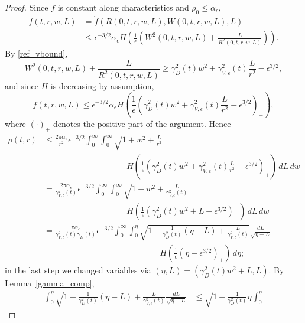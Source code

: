 \documentclass[10pt,a4paper]{amsart}
\begin{document}
\begin{proof}
  Since $f$ is constant along characteristics and
  $\rho_0\leq \alpha_\epsilon$,
  \begin{align*}
    f(t,r,w,L)
    &= \mathring f (R(0,t,r,w,L),W(0,t,r,w,L),L)\\
    &\leq
    \epsilon^{-3/2} \alpha_\epsilon
    H\left(\frac{1}{\epsilon}\left(W^2(0,t,r,w,L)+\frac{L}{R^2(0,t,r,w,L)}
    \right)\right).
  \end{align*}
  By \eqref{ref_vbound},
  \[
  W^2(0,t,r,w,L)+\frac{L}{R^2(0,t,r,w,L)} \geq
  \gamma_D^2(t) w^2 + \gamma^2_{V,\epsilon}(t) \frac{L}{r^2}-\epsilon^{3/2},
  \]
  and since $H$ is decreasing by assumption,
  \[
  f(t,r,w,L)  \leq 
  \epsilon^{-3/2} \alpha_\epsilon
  H\left(\frac{1}{\epsilon}
  \left(\gamma_D^2(t) w^2 + \gamma^2_{V,\epsilon}(t) \frac{L}{r^2}
  -\epsilon^{3/2}\right)_+\right),
  \]
  where $(\cdot)_+$ denotes the positive part of the argument. Hence
  \begin{align*}
    \rho(t,r)
    &
    \leq 
    \frac{2 \pi \alpha_\epsilon}{r^2}\epsilon^{-3/2}
    \int_0^\infty\int_0^\infty \sqrt{1+w^2 +\frac{L}{r^2}}\\
    &
    \qquad\qquad\qquad\qquad\qquad
    H\left(\frac{1}{\epsilon}
    \left(\gamma_D^2(t) w^2 + \gamma^2_{V,\epsilon}(t) \frac{L}{r^2}
    -\epsilon^{3/2}\right)_+\right)
    \,dL\,dw\\
    &
    = 
    \frac{2 \pi \alpha_\epsilon}{\gamma^2_{V,\epsilon}(t)}\epsilon^{-3/2}
    \int_0^\infty\int_0^\infty \sqrt{1+w^2 +\frac{L}{\gamma^2_{V,\epsilon}(t)}}\\
    &
    \qquad\qquad\qquad\qquad\qquad
    H\left(\frac{1}{\epsilon}
    \left(\gamma_D^2(t) w^2 +  L -\epsilon^{3/2}\right)_+\right)
    \,dL\,dw\\
    &
    = 
    \frac{\pi \alpha_\epsilon}{\gamma^2_{V,\epsilon}(t) \gamma_D(t)}\epsilon^{-3/2}
    \int_0^\infty\int_0^\eta
    \sqrt{1+\frac{1}{\gamma_D^2(t)} (\eta - L) +\frac{L}{\gamma^2_{V,\epsilon}(t)}}
    \frac{dL}{\sqrt{\eta-L}}\\
    &
    \qquad\qquad\qquad\qquad\qquad\qquad\qquad
    H\left(\frac{1}{\epsilon}
    \left(\eta -\epsilon^{3/2}\right)_+ \right)\, d\eta;
  \end{align*}
  in the last step we changed variables via
  $(\eta,L)=(\gamma_D^2(t) w^2 +  L,L)$.
  By Lemma~\ref{gamma_comp},
  \begin{align*}
    \int_0^\eta
    \sqrt{1+\frac{1}{\gamma_D^2(t)} (\eta - L) +\frac{L}{\gamma^2_{V,\epsilon}(t)}}
    \frac{dL}{\sqrt{\eta-L}}
    &\leq
    \sqrt{1+\frac{1}{\gamma_D^2(t)} \eta} \int_0^\eta

\end{align*}
\end{proof}
\end{document}
